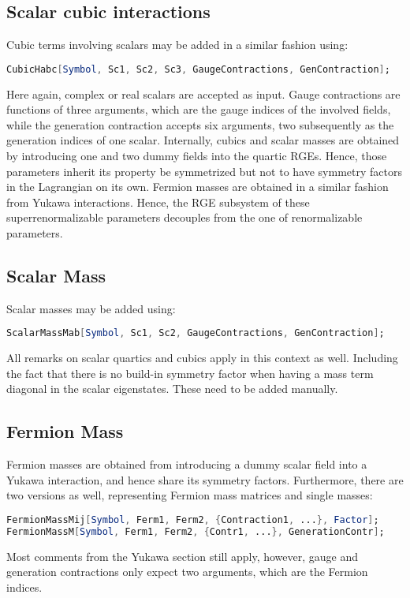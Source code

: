 \documentclass{scrartcl}
\begin{document}
\subsection{Scalar cubic interactions}
Cubic terms involving scalars may be added in a similar fashion using:
\begin{lstlisting}[language=mathematica,mathescape,columns=flexible,backgroundcolor=\color{light-gray}]
CubicHabc[Symbol, Sc1, Sc2, Sc3, GaugeContractions, GenContraction];
\end{lstlisting}
Here again, complex or real scalars are accepted as input. Gauge contractions are functions of three arguments, which are the gauge indices of the involved fields, while the generation contraction accepts six arguments, two subsequently as the generation indices of one scalar. Internally, cubics and scalar masses are obtained by introducing one and two dummy fields into the quartic RGEs. Hence, those parameters inherit its property be symmetrized but not to have symmetry factors in the Lagrangian on its own. Fermion masses are obtained in a similar fashion from Yukawa interactions. Hence, the RGE subsystem of these superrenormalizable parameters decouples from the one of renormalizable parameters.
\subsection{Scalar Mass}
Scalar masses may be added using:
\begin{lstlisting}[language=mathematica,mathescape,columns=flexible,backgroundcolor=\color{light-gray}]
ScalarMassMab[Symbol, Sc1, Sc2, GaugeContractions, GenContraction];
\end{lstlisting}
All remarks on scalar quartics and cubics apply in this context as well. Including the fact that there is no build-in symmetry factor when having a mass term diagonal in the scalar eigenstates. These need to be added manually.
\subsection{Fermion Mass}
Fermion masses are obtained from introducing a dummy scalar field into a Yukawa interaction, and hence share its symmetry factors. Furthermore, there are two versions as well, representing Fermion mass matrices and single masses:
\begin{lstlisting}[language=mathematica,mathescape,columns=flexible,backgroundcolor=\color{light-gray}]
FermionMassMij[Symbol, Ferm1, Ferm2, {Contraction1, ...}, Factor];
FermionMassM[Symbol, Ferm1, Ferm2, {Contr1, ...}, GenerationContr];
\end{lstlisting}
Most comments from the Yukawa section still apply, however, gauge and generation contractions only expect two arguments, which are the Fermion indices.
\end{document}
